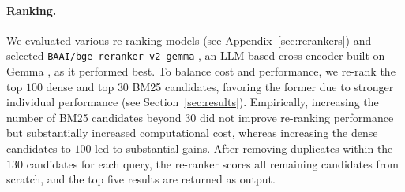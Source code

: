 \paragraph{Ranking.}
We evaluated various re-ranking models (see Appendix~\ref{sec:rerankers}) and selected \texttt{BAAI/bge-reranker-v2-gemma} \cite{li_making_2023, chen_m3-embedding_2024}, an LLM-based cross encoder built on Gemma \cite{gemma_team_gemma_2024}, as it performed best. 
To balance cost and performance, we re-rank the top $100$ dense and top $30$ BM25 candidates, favoring the former due to stronger individual performance (see Section~\ref{sec:results}). Empirically, increasing the number of BM25 candidates beyond $30$ did not improve re-ranking performance but substantially increased computational cost, whereas increasing the dense candidates to $100$ led to substantial gains.
After removing duplicates within the $130$ candidates for each query, the re-ranker scores all remaining candidates from scratch, and the top five results are returned as output.
